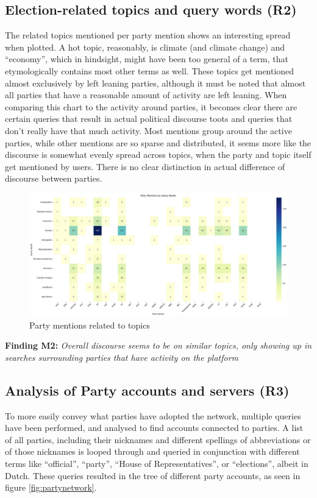 \subsection{Election-related topics and query words (R2)}
The related topics mentioned per party mention shows an interesting spread when plotted.
A hot topic, reasonably, is climate (and climate change) and “economy”, which in hindsight, might have been too general of a term, that etymologically contains most other terms as well.
These topics get mentioned almost exclusively by left leaning parties, although it must be noted that almost all parties that have a reasonable amount of activity are left leaning.
When comparing this chart to the activity around parties, it becomes clear there are certain queries that result in actual political discourse toots and queries that don't really have that much activity.
Most mentions group around the active parties, while other mentions are so sparse and distributed, it seems more like the discourse is somewhat evenly spread across topics, when the party and topic itself get mentioned by users.
There is no clear distinction in actual difference of discourse between parties.
\begin{figure}[ht]
  \centering
  \includegraphics[width=\linewidth]{media/party-mentions-topics.jpeg}
  \caption{Party mentions related to topics}
  \label{fig:topic}
\end{figure}


\textbf{Finding M2:} \textit{Overall discourse seems to be on similar topics, only showing up in searches surrounding parties that have activity on the platform}

\subsection{Analysis of Party accounts and servers (R3)}
To more easily convey what parties have adopted the network, multiple queries have been performed, and analysed to find accounts connected to parties.
A list of all parties, including their nicknames and different spellings of abbreviations or of those nicknames is looped through and queried in conjunction with different terms like “official”, “party”, “House of Representatives”, or “elections”, albeit in Dutch.
These queries resulted in the tree of different party accounts, as seen in figure \ref{fig:partynetwork}.

